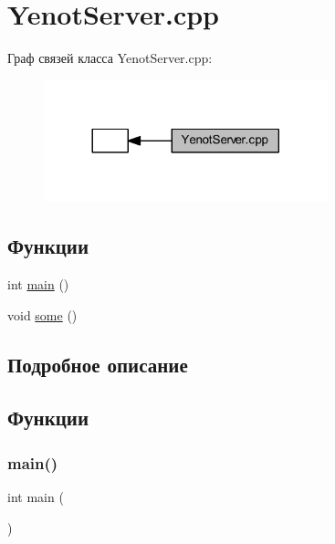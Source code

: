 \hypertarget{group__serveryenotservercpp}{}\section{Yenot\+Server.\+cpp}
\label{group__serveryenotservercpp}
Граф связей класса Yenot\+Server.\+cpp\+:\nopagebreak
\begin{figure}[H]
\begin{center}
\leavevmode
\includegraphics[width=233pt]{group__serveryenotservercpp}
\end{center}
\end{figure}
\subsection*{Функции}
\begin{DoxyCompactItemize}
\item 
int \mbox{\hyperlink{group__serveryenotservercpp_gae66f6b31b5ad750f1fe042a706a4e3d4}{main}} ()
\item 
void \mbox{\hyperlink{group__serveryenotservercpp_ga3bf507bc2b43ea8ed45bdfeaf8d11171}{some}} ()
\end{DoxyCompactItemize}


\subsection{Подробное описание}


\subsection{Функции}
\mbox{\label{group__serveryenotservercpp_gae66f6b31b5ad750f1fe042a706a4e3d4}} 
\subsubsection{\texorpdfstring{main()}{main()}}
{\footnotesize\ttfamily int main (\begin{DoxyParamCaption}{ }\end{DoxyParamCaption})}



